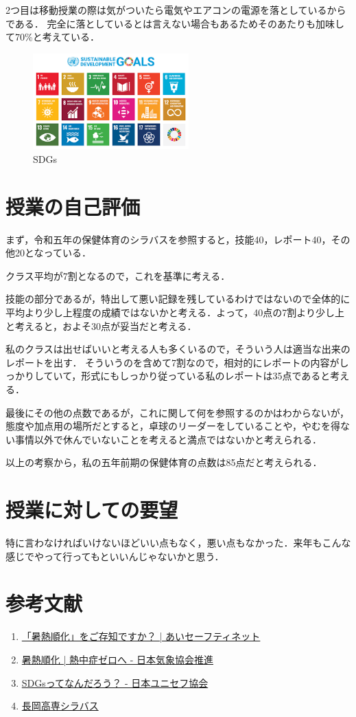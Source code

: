 \documentclass[twocolumn]{jsarticle}
\begin{document}
2つ目は移動授業の際は気がついたら電気やエアコンの電源を落としているからである．
完全に落としているとは言えない場合もあるためそのあたりも加味して70\%と考えている．

\begin{figure}[htbp]
  \centering
  \includegraphics[width=6cm]{kill_4.png}
  \caption{SDGs}
  \label{kill2}
\end{figure}

\section{授業の自己評価}
まず，令和五年の保健体育のシラバスを参照すると，技能40，レポート40，その他20となっている．

クラス平均が7割となるので，これを基準に考える．

技能の部分であるが，特出して悪い記録を残しているわけではないので全体的に平均より少し上程度の成績ではないかと考える．よって，40点の7割より少し上と考えると，およそ30点が妥当だと考える．

私のクラスは出せばいいと考える人も多くいるので，そういう人は適当な出来のレポートを出す．
そういうのを含めて7割なので，相対的にレポートの内容がしっかりしていて，形式にもしっかり従っている私のレポートは35点であると考える．

最後にその他の点数であるが，これに関して何を参照するのかはわからないが，態度や加点用の場所だとすると，卓球のリーダーをしていることや，やむを得ない事情以外で休んでいないことを考えると満点ではないかと考えられる．

以上の考察から，私の五年前期の保健体育の点数は85点だと考えられる．

\section{授業に対しての要望}
特に言わなければいけないほどいい点もなく，悪い点もなかった．来年もこんな感じでやって行ってもといいんじゃないかと思う．
\section*{参考文献}
\begin{enumerate}
  \item \href{https://kawakita.or.jp/aisafetynet/aistation/news/「温熱順化」をご存知ですか？/}{「暑熱順化」をご存知ですか？ | あいセーフティネット}
  \item \href{https://www.netsuzero.jp/learning/le15}{暑熱順化 | 熱中症ゼロへ - 日本気象協会推進}
  \item \href{https://www.unicef.or.jp/kodomo/sdgs/about/}{SDGsってなんだろう？ - 日本ユニセフ協会}
  \item \href{https://syllabus.kosen-k.go.jp/Pages/PublicSyllabus?school_id=16&department_id=14&subject_id=0102&year=2018&lang=ja}{長岡高専シラバス}
\end{enumerate}
\end{document}
